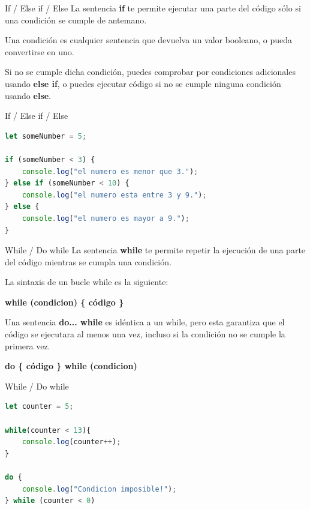\documentclass{beamer}
\begin{document}
\begin{frame}{If / Else if / Else}
La sentencia \textbf{if} te permite ejecutar una parte del código sólo si una condición se cumple de antemano. 

Una condición es cualquier sentencia que devuelva un valor booleano, o pueda convertirse en uno.

Si no se cumple dicha condición, puedes comprobar por condiciones adicionales usando \textbf{else if}, o puedes ejecutar código si no se cumple ninguna condición usando \textbf{else}.
\end{frame}

\begin{frame}[fragile]{If / Else if / Else}
\begin{lstlisting}[language=JavaScript]
let someNumber = 5;

if (someNumber < 3) {
    console.log("el numero es menor que 3.");
} else if (someNumber < 10) {
    console.log("el numero esta entre 3 y 9.");
} else {
    console.log("el numero es mayor a 9.");
}
\end{lstlisting}
\end{frame}

\begin{frame}{While / Do while}
La sentencia \textbf{while} te permite repetir la ejecución de una parte del código mientras se cumpla una condición.

La sintaxis de un bucle while es la siguiente:

\textbf{while (condicion) \{ código \} }

Una sentencia \textbf{do... while} es idéntica a un while, pero esta garantiza que el código se ejecutara al menos una vez, incluso si la condición no se cumple la primera vez.

\textbf{do \{ código \} while (condicion) }

\end{frame}

\begin{frame}[fragile]{While / Do while}
\begin{lstlisting}[language=JavaScript]
let counter = 5;

while(counter < 13){
    console.log(counter++);
}

do {
    console.log("Condicion imposible!");
} while (counter < 0)   
\end{lstlisting}
\end{frame}
\end{document}
